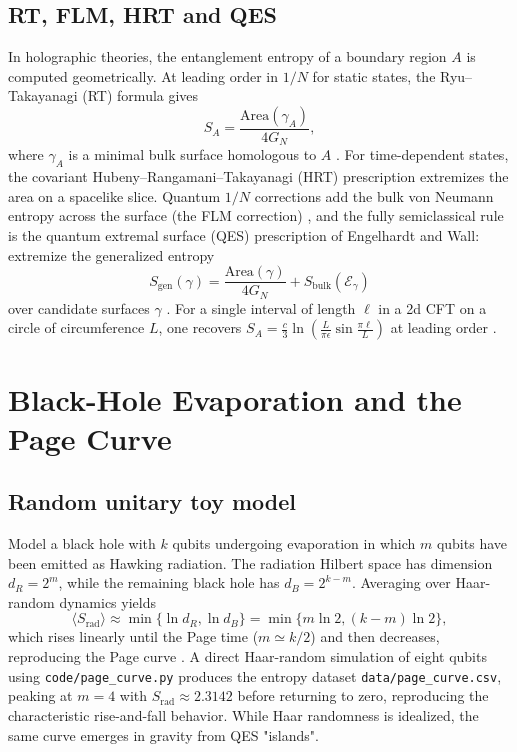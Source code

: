 \documentclass[12pt, numbers, sort&compress]{article}
\begin{document}
\subsection{RT, FLM, HRT and QES}
In holographic theories, the entanglement entropy of a boundary region $A$ is computed geometrically. At leading order in $1/N$ for static states, the Ryu–Takayanagi (RT) formula gives
\begin{equation}
S_A = \frac{\mathrm{Area}(\gamma_A)}{4G_N},
\end{equation}
where $\gamma_A$ is a minimal bulk surface homologous to $A$ \cite{Ryu:2006prl}. For time-dependent states, the covariant Hubeny–Rangamani–Takayanagi (HRT) prescription extremizes the area on a spacelike slice. Quantum $1/N$ corrections add the bulk von Neumann entropy across the surface (the FLM correction) \cite{Faulkner:2013FLM}, and the fully semiclassical rule is the quantum extremal surface (QES) prescription of Engelhardt and Wall: extremize the generalized entropy
\begin{equation}
S_{\text{gen}}(\gamma) = \frac{\mathrm{Area}(\gamma)}{4G_N} + S_{\text{bulk}}(\mathcal{E}_\gamma)
\label{QES}
\end{equation}
over candidate surfaces $\gamma$ \cite{EngelhardtWall:2015QES}. For a single interval of length $\ell$ in a 2d CFT on a circle of circumference $L$, one recovers $S_A = \frac{c}{3}\ln\left(\frac{L}{\pi\epsilon}\sin\frac{\pi\ell}{L}\right)$ at leading order \cite{Ryu:2006prl}.

\section{Black-Hole Evaporation and the Page Curve}

\subsection{Random unitary toy model}
Model a black hole with $k$ qubits undergoing evaporation in which $m$ qubits have been emitted as Hawking radiation. The radiation Hilbert space has dimension $d_R=2^m$, while the remaining black hole has $d_B=2^{k-m}$. Averaging over Haar-random dynamics yields
\begin{equation}
\langle S_{\text{rad}}\rangle \approx \min\{\ln d_R, \ln d_B\} = \min\{m\ln 2, (k-m)\ln 2\},
\end{equation}
which rises linearly until the Page time ($m\simeq k/2$) and then decreases, reproducing the Page curve \cite{Page:1993prl}.
A direct Haar-random simulation of eight qubits using \texttt{code/page\_curve.py} produces the entropy dataset \texttt{data/page\_curve.csv}, peaking at $m=4$ with $S_{\text{rad}}\approx2.3142$ before returning to zero, reproducing the characteristic rise-and-fall behavior. While Haar randomness is idealized, the same curve emerges in gravity from QES "islands".
\end{document}
